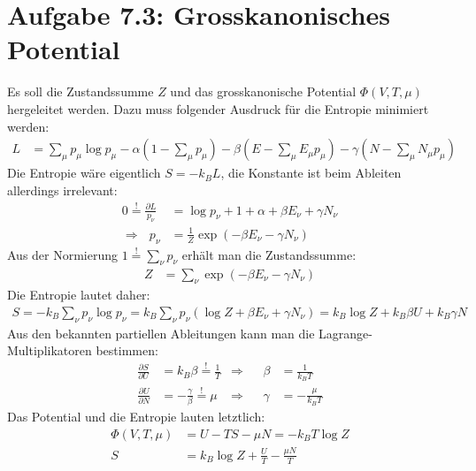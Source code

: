 \documentclass[a4paper,12pt]{article}
\newcommand{\kla}{}
\begin{document}
\section*{Aufgabe 7.3: Grosskanonisches Potential}
Es soll die Zustandssumme $Z$ und das grosskanonische Potential $\Phi(V,T,\mu)$ hergeleitet werden. Dazu muss folgender Ausdruck für die Entropie minimiert werden:
\begin{align*}
L&=\sum_\mu p_\mu\log p_\mu -\alpha\kla\left( {1-\sum_\mu p_\mu } \right)-\beta\kla\left( {E-\sum_\mu E_\mu p_\mu } \right)-\gamma\kla\left( {N-\sum_\mu N_\mu p_\mu } \right)
\end{align*}
Die Entropie wäre eigentlich $S=-k_BL$, die Konstante ist beim Ableiten allerdings irrelevant:
\begin{align*}
0\overset{!}{=}\frac{\partial L}{p_\nu}&=\log p_\nu +1+\alpha +\beta E_\nu + \gamma N_\nu\\
\Rightarrow\ \ \ p_\nu &=\frac{1}{Z}\exp\kla\left( {-\beta E_\nu -\gamma N_\nu} \right)
\end{align*}
Aus der Normierung $1\overset{!}{=}\sum_\nu p_\nu$ erhält man die Zustandssumme:
\begin{align*}
Z&=\sum_\nu\exp\kla\left( {-\beta E_\nu-\gamma N_\nu} \right)
\end{align*}
Die Entropie lautet daher:
\begin{align*}
S=-k_B\sum_\nu p_\nu\log p_\nu = k_B\sum_\nu p_\nu(\log Z+\beta E_\nu +\gamma N_\nu)=k_B\log Z+k_B\beta U+k_B\gamma N
\end{align*}
Aus den bekannten partiellen Ableitungen kann man die Lagrange-Multiplikatoren bestimmen:
\begin{align*}
\frac{\partial S}{\partial U}&=k_B\beta\overset{!}{=}\frac{1}{T}&\Rightarrow &&\beta &=\frac{1}{k_BT}\\
\frac{\partial U}{\partial N}&=-\frac{\gamma}{\beta}\overset{!}{=}\mu&\Rightarrow &&\gamma &=-\frac{\mu}{k_BT}
\end{align*}
Das Potential und die Entropie lauten letztlich:
\begin{align*}
\Phi(V,T,\mu)&=U-TS-\mu N=-k_BT\log Z\\
S&=k_B\log Z+\frac{U}{T}-\frac{\mu N}{T}
\end{align*}
\end{document}

